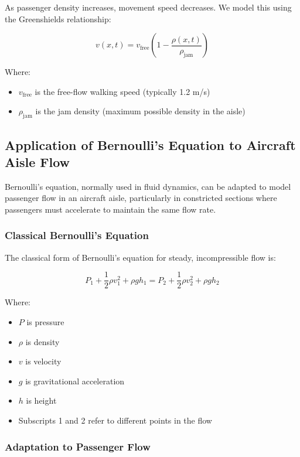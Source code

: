 \documentclass[a4paper,12pt]{article}
\begin{document}
As passenger density increases, movement speed decreases. We model this using the Greenshields relationship:

\begin{equation}
v(x,t) = v_{\text{free}} \left(1 - \frac{\rho(x,t)}{\rho_{\text{jam}}}\right)
\end{equation}

Where:
\begin{itemize}
    \item $v_{\text{free}}$ is the free-flow walking speed (typically 1.2 m/s)
    \item $\rho_{\text{jam}}$ is the jam density (maximum possible density in the aisle)
\end{itemize}

\subsection{Application of Bernoulli's Equation to Aircraft Aisle Flow}

Bernoulli's equation, normally used in fluid dynamics, can be adapted to model passenger flow in an aircraft aisle, particularly in constricted sections where passengers must accelerate to maintain the same flow rate.

\subsubsection{Classical Bernoulli's Equation}

The classical form of Bernoulli's equation for steady, incompressible flow is:

\begin{equation}
P_1 + \frac{1}{2}\rho v_1^2 + \rho g h_1 = P_2 + \frac{1}{2}\rho v_2^2 + \rho g h_2
\end{equation}

Where:
\begin{itemize}
    \item $P$ is pressure
    \item $\rho$ is density
    \item $v$ is velocity
    \item $g$ is gravitational acceleration
    \item $h$ is height
    \item Subscripts 1 and 2 refer to different points in the flow
\end{itemize}

\subsubsection{Adaptation to Passenger Flow}
\end{document}
